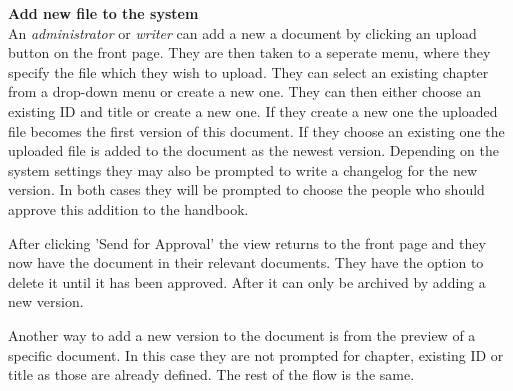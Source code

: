 \textbf{Add new file to the system}
\\
An \textit{administrator} or \textit{writer} can add a new a document by clicking an upload button on the front page.
They are then taken to a seperate menu, where they specify the file which they wish to upload.
They can select an existing chapter from a drop-down menu or create a new one. 
They can then either choose an existing ID and title or create a new one.
If they create a new one the uploaded file becomes the first version of this document.
If they choose an existing one the uploaded file is added to the document as the newest version.
Depending on the system settings they may also be prompted to write a changelog for the new version.
In both cases they will be prompted to choose the people who should approve this addition to the handbook.

After clicking 'Send for Approval' the view returns to the front page and they now have the document in their relevant documents.
They have the option to delete it until it has been approved.
After it can only be archived by adding a new version.

Another way to add a new version to the document is from the preview of a specific document.
In this case they are not prompted for chapter, existing ID or title as those are already defined.
The rest of the flow is the same.


